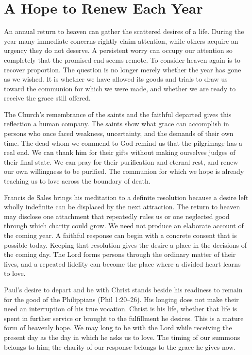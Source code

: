 \section{A Hope to Renew Each Year}

An annual return to heaven can gather the scattered desires of a life. During the year many immediate concerns rightly claim attention, while others acquire an urgency they do not deserve. A persistent worry can occupy our attention so completely that the promised end seems remote. To consider heaven again is to recover proportion. The question is no longer merely whether the year has gone as we wished. It is whether we have allowed its goods and trials to draw us toward the communion for which we were made, and whether we are ready to receive the grace still offered.

The Church's remembrance of the saints and the faithful departed gives this reflection a human company. The saints show what grace can accomplish in persons who once faced weakness, uncertainty, and the demands of their own time. The dead whom we commend to God remind us that the pilgrimage has a real end. We can thank him for their gifts without making ourselves judges of their final state. We can pray for their purification and eternal rest, and renew our own willingness to be purified. The communion for which we hope is already teaching us to love across the boundary of death.

Francis de Sales brings his meditation to a definite resolution because a desire left wholly indefinite can be displaced by the next attraction. The return to heaven may disclose one attachment that repeatedly rules us or one neglected good through which charity could grow. We need not produce an elaborate account of the coming year. A faithful response can begin with a concrete consent that is possible today. Keeping that resolution gives the desire a place in the decisions of the coming day. The Lord forms persons through the ordinary matter of their lives, and a repeated fidelity can become the place where a divided heart learns to love.

Paul's desire to depart and be with Christ stands beside his readiness to remain for the good of the Philippians (Phil 1:20--26). His longing does not make their need an interruption of his true vocation. Christ is his life, whether that life is spent in further service or brought to the fulfillment he desires. This is a mature form of heavenly hope. We may long to be with the Lord while receiving the present day as the day in which he asks us to love. The timing of our summons belongs to him; the charity of our response belongs to the grace he gives now.

